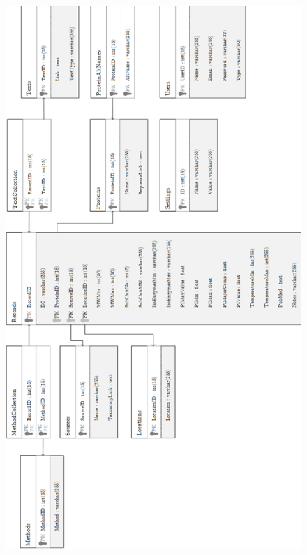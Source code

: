 \begin{subappendices}
  \begin{figure}[H]
    \centering
    \includegraphics{assets/uml-previous-fyp-database.png}
  \end{figure}

\end{subappendices}

